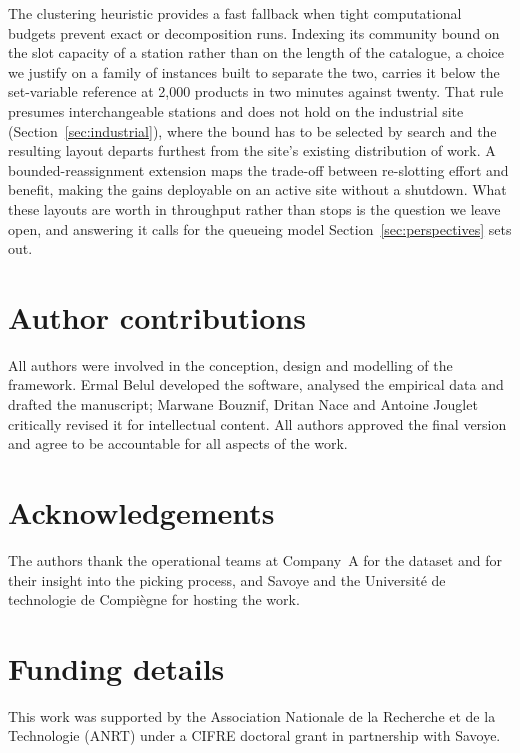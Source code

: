 \documentclass[]{interact}
\begin{document}
The clustering heuristic provides a fast fallback when tight computational budgets prevent exact or decomposition runs. Indexing its community bound on the slot capacity of a station rather than on the length of the catalogue, a choice we justify on a family of instances built to separate the two, carries it below the set-variable reference at 2,000 products in two minutes against twenty. That rule presumes interchangeable stations and does not hold on the industrial site (Section~\ref{sec:industrial}), where the bound has to be selected by search and the resulting layout departs furthest from the site's existing distribution of work. A bounded-reassignment extension maps the trade-off between re-slotting effort and benefit, making the gains deployable on an active site without a shutdown. What these layouts are worth in throughput rather than stops is the question we leave open, and answering it calls for the queueing model Section~\ref{sec:perspectives} sets out.

\section*{Author contributions}
All authors were involved in the conception, design and modelling of the framework. Ermal Belul developed the software, analysed the empirical data and drafted the manuscript; Marwane Bouznif, Dritan Nace and Antoine Jouglet critically revised it for intellectual content. All authors approved the final version and agree to be accountable for all aspects of the work.

\section*{Acknowledgements}
The authors thank the operational teams at Company~A for the dataset and for their insight into the picking process, and Savoye and the Universit\'{e} de technologie de Compi\`{e}gne for hosting the work.

\section*{Funding details}
This work was supported by the Association Nationale de la Recherche et de la Technologie (ANRT) under a CIFRE doctoral grant in partnership with Savoye.
\end{document}
